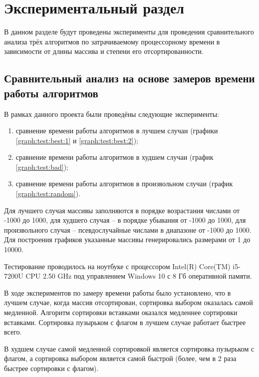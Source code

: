 \chapter{Экспериментальный раздел}
\label{cha:research}
    В данном разделе будут проведены эксперименты для проведения 
    сравнительного анализа трёх алгоритмов по затрачиваемому процессорному 
    времени в зависимости от длины массива и степени его отсортированности.

    \section{Сравнительный анализ на основе замеров времени работы алгоритмов}
        В рамках данного проекта были проведёны следующие эксперименты:
        \begin{enumerate}
            \item сравнение времени работы алгоритмов в лучшем случаи (графики \ref{graph:test:best:1} и \ref{graph:test:best:2});
            \item сравнение времени работы алгоритмов в худшем случаи (график \ref{graph:test:bad});
            \item сравнение времени работы алгоритмов в произвольном случаи (график \ref{graph:test:random}).
        \end{enumerate}

        Для лучшего случая массивы заполняются в порядке возрастания числами от -1000 до 1000,
        для худшего случая -- в порядке убывания от -1000 до 1000, для произвольного случая --
        псевдослучайные числами в диапазоне от -1000 до 1000. Для построения графиков 
        указанные массивы генерировались размерами от 1 до 10000.

        Тестирование проводилось на ноутбуке с процессором
        Intel(R) Core(TM) i5-7200U CPU 2.50 GHz \cite{processor-i5-7200u}
        под управлением Windows 10 с 8 Гб оперативной памяти.

        В ходе экспериментов по замеру времени работы было установлено, что 
        в лучшем случае, когда массив отсортирован, сортировка выбором оказалась самой медленной.
        Алгоритм сортировки вставками оказался медленнее сортировки вставками.
        Сортировка пузырьком с флагом в лучшем случае работает быстрее всего.

        В худшем случае самой медленной сортировкой является сортировка пузырьком с флагом,
        а сортировка выбором является самой быстрой (более, чем в 2 раза быстрее сортировки с флагом).

